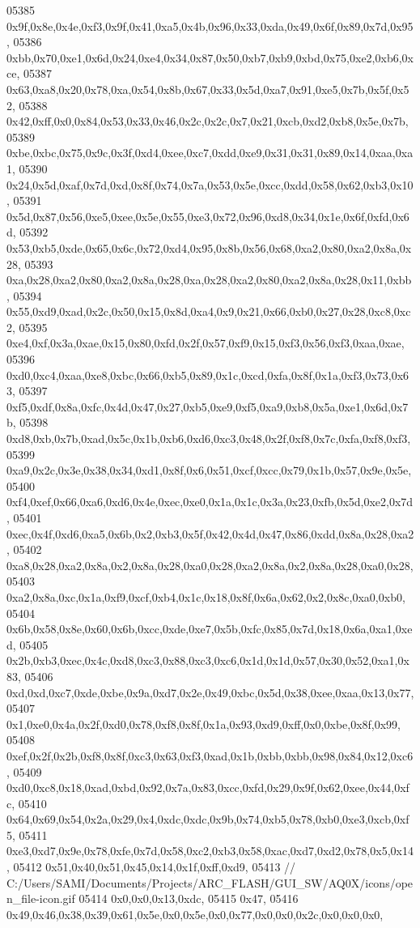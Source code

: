 \begin{DoxyCode}
05385   0x9f,0x8e,0x4e,0xf3,0x9f,0x41,0xa5,0x4b,0x96,0x33,0xda,0x49,0x6f,0x89,0x7d,0x95,
05386   0xbb,0x70,0xe1,0x6d,0x24,0xe4,0x34,0x87,0x50,0xb7,0xb9,0xbd,0x75,0xe2,0xb6,0xce,
05387   0x63,0xa8,0x20,0x78,0xa,0x54,0x8b,0x67,0x33,0x5d,0xa7,0x91,0xe5,0x7b,0x5f,0x52,
05388   0x42,0xff,0x0,0x84,0x53,0x33,0x46,0x2c,0x2c,0x7,0x21,0xcb,0xd2,0xb8,0x5e,0x7b,
05389   0xbe,0xbc,0x75,0x9c,0x3f,0xd4,0xee,0xc7,0xdd,0xe9,0x31,0x31,0x89,0x14,0xaa,0xa1,
05390   0x24,0x5d,0xaf,0x7d,0xd,0x8f,0x74,0x7a,0x53,0x5e,0xcc,0xdd,0x58,0x62,0xb3,0x10,
05391   0x5d,0x87,0x56,0xe5,0xee,0x5e,0x55,0xe3,0x72,0x96,0xd8,0x34,0x1e,0x6f,0xfd,0x6d,
05392   0x53,0xb5,0xde,0x65,0x6c,0x72,0xd4,0x95,0x8b,0x56,0x68,0xa2,0x80,0xa2,0x8a,0x28,
05393   0xa,0x28,0xa2,0x80,0xa2,0x8a,0x28,0xa,0x28,0xa2,0x80,0xa2,0x8a,0x28,0x11,0xbb,
05394   0x55,0xd9,0xad,0x2c,0x50,0x15,0x8d,0xa4,0x9,0x21,0x66,0xb0,0x27,0x28,0xc8,0xc2,
05395   0xe4,0xf,0x3a,0xae,0x15,0x80,0xfd,0x2f,0x57,0xf9,0x15,0xf3,0x56,0xf3,0xaa,0xae,
05396   0xd0,0xc4,0xaa,0xe8,0xbc,0x66,0xb5,0x89,0x1c,0xcd,0xfa,0x8f,0x1a,0xf3,0x73,0x63,
05397   0xf5,0xdf,0x8a,0xfc,0x4d,0x47,0x27,0xb5,0xe9,0xf5,0xa9,0xb8,0x5a,0xe1,0x6d,0x7b,
05398   0xd8,0xb,0x7b,0xad,0x5c,0x1b,0xb6,0xd6,0xc3,0x48,0x2f,0xf8,0x7c,0xfa,0xf8,0xf3,
05399   0xa9,0x2c,0x3e,0x38,0x34,0xd1,0x8f,0x6,0x51,0xcf,0xcc,0x79,0x1b,0x57,0x9e,0x5e,
05400   0xf4,0xef,0x66,0xa6,0xd6,0x4e,0xec,0xe0,0x1a,0x1c,0x3a,0x23,0xfb,0x5d,0xe2,0x7d,
05401   0xec,0x4f,0xd6,0xa5,0x6b,0x2,0xb3,0x5f,0x42,0x4d,0x47,0x86,0xdd,0x8a,0x28,0xa2,
05402   0xa8,0x28,0xa2,0x8a,0x2,0x8a,0x28,0xa0,0x28,0xa2,0x8a,0x2,0x8a,0x28,0xa0,0x28,
05403   0xa2,0x8a,0xc,0x1a,0xf9,0xcf,0xb4,0x1c,0x18,0x8f,0x6a,0x62,0x2,0x8c,0xa0,0xb0,
05404   0x6b,0x58,0x8e,0x60,0x6b,0xcc,0xde,0xe7,0x5b,0xfc,0x85,0x7d,0x18,0x6a,0xa1,0xed,
05405   0x2b,0xb3,0xec,0x4c,0xd8,0xc3,0x88,0xc3,0xc6,0x1d,0x1d,0x57,0x30,0x52,0xa1,0x83,
05406   0xd,0xd,0xc7,0xde,0xbe,0x9a,0xd7,0x2e,0x49,0xbc,0x5d,0x38,0xee,0xaa,0x13,0x77,
05407   0x1,0xe0,0x4a,0x2f,0xd0,0x78,0xf8,0x8f,0x1a,0x93,0xd9,0xff,0x0,0xbe,0x8f,0x99,
05408   0xef,0x2f,0x2b,0xf8,0x8f,0xc3,0x63,0xf3,0xad,0x1b,0xbb,0xbb,0x98,0x84,0x12,0xc6,
05409   0xd0,0xc8,0x18,0xad,0xbd,0x92,0x7a,0x83,0xcc,0xfd,0x29,0x9f,0x62,0xee,0x44,0xfc,
05410   0x64,0x69,0x54,0x2a,0x29,0x4,0xdc,0xdc,0x9b,0x74,0xb5,0x78,0xb0,0xe3,0xcb,0xf5,
05411   0xe3,0xd7,0x9e,0x78,0xfe,0x7d,0x58,0xc2,0xb3,0x58,0xac,0xd7,0xd2,0x78,0x5,0x14,
05412   0x51,0x40,0x51,0x45,0x14,0x1f,0xff,0xd9,
05413     \textcolor{comment}{// C:/Users/SAMI/Documents/Projects/ARC\_FLASH/GUI\_SW/AQ0X/icons/open\_file-icon.gif}
05414   0x0,0x0,0x13,0xdc,
05415   0x47,
05416   0x49,0x46,0x38,0x39,0x61,0x5e,0x0,0x5e,0x0,0x77,0x0,0x0,0x2c,0x0,0x0,0x0,

\end{DoxyCode}
